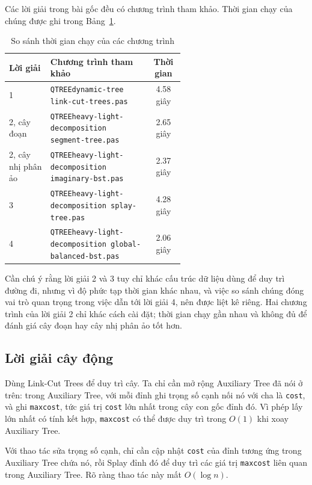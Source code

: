 \documentclass[11pt]{article}
\begin{document}
Các lời giải trong bài gốc đều có chương trình tham khảo. Thời gian chạy của
chúng được ghi trong Bảng~\ref{tab:runtime}.

\begin{table}[htbp]
\centering
\begin{tabular}{lp{0.58\linewidth}c}
\hline
\textbf{Lời giải} & \textbf{Chương trình tham khảo} & \textbf{Thời gian} \\
\hline
1 & \texttt{QTREEdynamic-tree link-cut-trees.pas} & 4.58 giây \\
2, cây đoạn & \texttt{QTREEheavy-light-decomposition segment-tree.pas} &
2.65 giây \\
2, cây nhị phân ảo & \texttt{QTREEheavy-light-decomposition imaginary-bst.pas} &
2.37 giây \\
3 & \texttt{QTREEheavy-light-decomposition splay-tree.pas} & 4.28 giây \\
4 & \texttt{QTREEheavy-light-decomposition global-balanced-bst.pas} &
2.06 giây \\
\hline
\end{tabular}
\caption{So sánh thời gian chạy của các chương trình}
\label{tab:runtime}
\end{table}

Cần chú ý rằng lời giải 2 và 3 tuy chỉ khác cấu trúc dữ liệu dùng để duy trì
đường đi, nhưng vì độ phức tạp thời gian khác nhau, và việc so sánh chúng đóng
vai trò quan trọng trong việc dẫn tới lời giải 4, nên được liệt kê riêng. Hai
chương trình của lời giải 2 chỉ khác cách cài đặt; thời gian chạy gần nhau và
không đủ để đánh giá cây đoạn hay cây nhị phân ảo tốt hơn.

\subsection{Lời giải cây động}

Dùng Link-Cut Trees để duy trì cây. Ta chỉ cần mở rộng Auxiliary Tree đã nói ở
trên: trong Auxiliary Tree, với mỗi đỉnh ghi trọng số cạnh nối nó với cha là
\texttt{cost}, và ghi \texttt{maxcost}, tức giá trị \texttt{cost} lớn nhất
trong cây con gốc đỉnh đó. Vì phép lấy lớn nhất có tính kết hợp, \texttt{maxcost}
có thể được duy trì trong $O(1)$ khi xoay Auxiliary Tree.

Với thao tác sửa trọng số cạnh, chỉ cần cập nhật \texttt{cost} của đỉnh tương
ứng trong Auxiliary Tree chứa nó, rồi Splay đỉnh đó để duy trì các giá trị
\texttt{maxcost} liên quan trong Auxiliary Tree. Rõ ràng thao tác này mất
$O(\log n)$.
\end{document}
